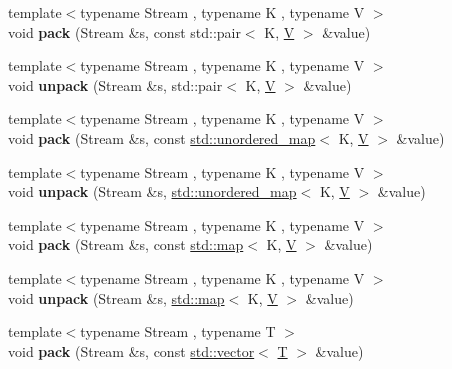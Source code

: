 \begin{DoxyCompactItemize}
{\footnotesize template$<$typename Stream , typename K , typename V $>$ }\\void {\bfseries pack} (Stream \&s, const std\+::pair$<$ K, \mbox{\hyperlink{struct_v}{V}} $>$ \&value)
\item 
\mbox{\label{namespacefc_1_1raw_a84c3c90a913dafd4c090f9891e25dd67}} 
{\footnotesize template$<$typename Stream , typename K , typename V $>$ }\\void {\bfseries unpack} (Stream \&s, std\+::pair$<$ K, \mbox{\hyperlink{struct_v}{V}} $>$ \&value)
\item 
\mbox{\label{namespacefc_1_1raw_a0cc49861443b438814db009e9181b60e}} 
{\footnotesize template$<$typename Stream , typename K , typename V $>$ }\\void {\bfseries pack} (Stream \&s, const \mbox{\hyperlink{classstd_1_1unordered__map}{std\+::unordered\+\_\+map}}$<$ K, \mbox{\hyperlink{struct_v}{V}} $>$ \&value)
\item 
\mbox{\label{namespacefc_1_1raw_a1c8ad87391e7a8b774f5668c7c0f48b3}} 
{\footnotesize template$<$typename Stream , typename K , typename V $>$ }\\void {\bfseries unpack} (Stream \&s, \mbox{\hyperlink{classstd_1_1unordered__map}{std\+::unordered\+\_\+map}}$<$ K, \mbox{\hyperlink{struct_v}{V}} $>$ \&value)
\item 
\mbox{\label{namespacefc_1_1raw_a27d0dba273c0ba43eb92bca1a7603797}} 
{\footnotesize template$<$typename Stream , typename K , typename V $>$ }\\void {\bfseries pack} (Stream \&s, const \mbox{\hyperlink{classstd_1_1map}{std\+::map}}$<$ K, \mbox{\hyperlink{struct_v}{V}} $>$ \&value)
\item 
\mbox{\label{namespacefc_1_1raw_a2170d3403828f6dac644f86a1a1ebe4b}} 
{\footnotesize template$<$typename Stream , typename K , typename V $>$ }\\void {\bfseries unpack} (Stream \&s, \mbox{\hyperlink{classstd_1_1map}{std\+::map}}$<$ K, \mbox{\hyperlink{struct_v}{V}} $>$ \&value)
\item 
\mbox{\label{namespacefc_1_1raw_a3112cabea66c93d30ac00024858272c4}} 
{\footnotesize template$<$typename Stream , typename T $>$ }\\void {\bfseries pack} (Stream \&s, const \mbox{\hyperlink{classstd_1_1vector}{std\+::vector}}$<$ \mbox{\hyperlink{struct_t}{T}} $>$ \&value)

\end{DoxyCompactItemize}
